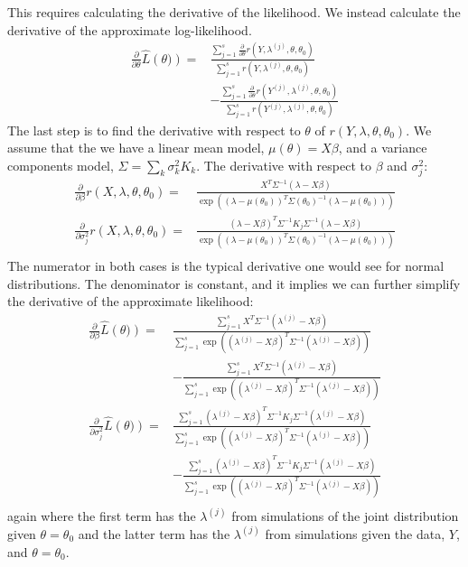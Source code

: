 \documentclass{acm_proc_article-sp}
\begin{document}
This requires calculating the derivative of the likelihood.  We instead calculate the derivative of the approximate log-likelihood.
\begin{align*}
\frac{\partial}{\partial \theta} \hat{L} \left( \theta) \right) =& \frac{\sum_{j=1}^s \frac{\partial}{\partial \theta} r \left( Y , \lambda^{(j)} , \theta, \theta_0 \right) }{\sum_{j=1}^s r \left( Y , \lambda^{(j)} , \theta, \theta_0 \right) } \\
&-\frac{\sum_{j=1}^s \frac{\partial}{\partial \theta} r \left( Y^{(j)} , \lambda^{(j)} , \theta, \theta_0 \right) }{\sum_{j=1}^s r \left( Y^{(j)} , \lambda^{(j)} , \theta, \theta_0 \right) }
\end{align*}
The last step is to find the derivative with respect to $\theta$ of $r(Y,\lambda, \theta, \theta_0)$.  We assume that the we have a linear mean model, $\mu(\theta) = X \beta$, and a variance components model, $\Sigma = \sum_k \sigma_k^2 K_k$.  The derivative with respect to $\beta$ and $\sigma_j^2$:
\begin{align*}
\frac{\partial}{\partial \beta} r(X,\lambda, \theta, \theta_0) =& \frac{X^T \Sigma^{-1} \left( \lambda  - X \beta \right) }{\exp \left( (\lambda - \mu(\theta_0))^T \Sigma(\theta_0)^{-1} (\lambda - \mu(\theta_0) ) \right)} \\
\frac{\partial}{\partial \sigma^2_j} r(X,\lambda, \theta, \theta_0) =& \frac{(\lambda - X \beta)^T \Sigma^{-1} K_j \Sigma^{-1} \left( \lambda  - X \beta \right) }{\exp \left( (\lambda - \mu(\theta_0))^T \Sigma(\theta_0)^{-1} (\lambda - \mu(\theta_0) ) \right)} \\
\end{align*}
The numerator in both cases is the typical derivative one would see for normal distributions.  The denominator is constant, and it implies we can further simplify the derivative of the approximate likelihood:
\begin{align*}
\frac{\partial}{\partial \beta} \hat{L} \left( \theta) \right) =& \frac{\sum_{j=1}^s X^T \Sigma^{-1} \left( \lambda^{(j)}  - X \beta \right) }{\sum_{j=1}^s  \exp \left( (\lambda^{(j)} - X\beta)^T \Sigma^{-1} (\lambda^{(j)} - X\beta) \right)} \\
&- \frac{\sum_{j=1}^s X^T \Sigma^{-1} \left( \lambda^{(j)}  - X \beta \right) }{\sum_{j=1}^s  \exp \left( (\lambda^{(j)} - X\beta)^T \Sigma^{-1} (\lambda^{(j)} - X\beta) \right)} \\
\frac{\partial}{\partial \sigma^2_j} \hat{L} \left( \theta) \right) =& \frac{\sum_{j=1}^s (\lambda^{(j)} - X\beta)^T \Sigma^{-1} K_j \Sigma^{-1} \left( \lambda^{(j)}  - X \beta \right) }{\sum_{j=1}^s  \exp \left( (\lambda^{(j)} - X\beta)^T \Sigma^{-1} (\lambda^{(j)} - X\beta) \right)} \\
&- \frac{\sum_{j=1}^s (\lambda^{(j)} - X\beta)^T \Sigma^{-1} K_j \Sigma^{-1} \left( \lambda^{(j)}  - X \beta \right) }{\sum_{j=1}^s  \exp \left( (\lambda^{(j)} - X\beta)^T \Sigma^{-1} (\lambda^{(j)} - X\beta) \right)} \\
\end{align*}
again where the first term has the $\lambda^{(j)}$ from simulations of the joint distribution given $\theta = \theta_0$ and the latter term has the $\lambda^{(j)}$ from simulations given the data, $Y$, and $\theta = \theta_0$.
\end{document}
